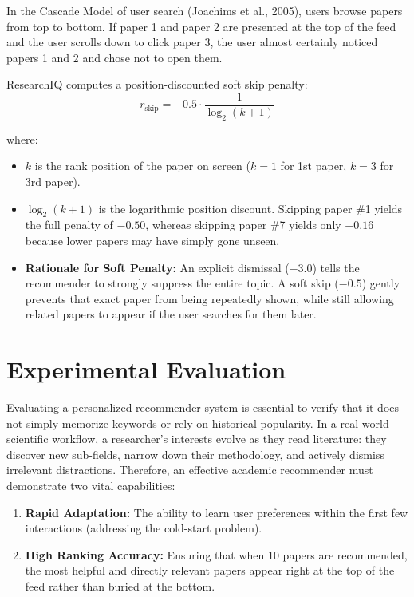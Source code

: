 \documentclass[11pt,a4paper]{article}
\begin{document}
In the Cascade Model of user search (Joachims et al., 2005), users browse papers from top to bottom. If paper 1 and paper 2 are presented at the top of the feed and the user scrolls down to click paper 3, the user almost certainly noticed papers 1 and 2 and chose not to open them.

ResearchIQ computes a position-discounted soft skip penalty:
\begin{equation}
r_{\text{skip}} = -0.5 \cdot \frac{1}{\log_2(k + 1)}
\end{equation}

\noindent where:
\begin{itemize}[leftmargin=1.5em]
    \item $k$ is the rank position of the paper on screen ($k=1$ for 1st paper, $k=3$ for 3rd paper).
    \item $\log_2(k + 1)$ is the logarithmic position discount. Skipping paper \#1 yields the full penalty of $-0.50$, whereas skipping paper \#7 yields only $-0.16$ because lower papers may have simply gone unseen.
    \item \textbf{Rationale for Soft Penalty:} An explicit dismissal ($-3.0$) tells the recommender to strongly suppress the entire topic. A soft skip ($-0.5$) gently prevents that exact paper from being repeatedly shown, while still allowing related papers to appear if the user searches for them later.
\end{itemize}

\section{Experimental Evaluation}

Evaluating a personalized recommender system is essential to verify that it does not simply memorize keywords or rely on historical popularity. In a real-world scientific workflow, a researcher's interests evolve as they read literature: they discover new sub-fields, narrow down their methodology, and actively dismiss irrelevant distractions. Therefore, an effective academic recommender must demonstrate two vital capabilities:
\begin{enumerate}[leftmargin=1.5em]
    \item \textbf{Rapid Adaptation:} The ability to learn user preferences within the first few interactions (addressing the cold-start problem).
    \item \textbf{High Ranking Accuracy:} Ensuring that when 10 papers are recommended, the most helpful and directly relevant papers appear right at the top of the feed rather than buried at the bottom.
\end{enumerate}
\end{document}
